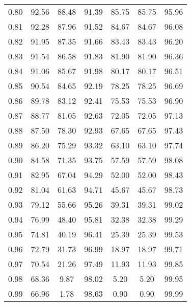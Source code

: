 \begin{tabular}{|c|c|c|c|c|c|c|}
      0.80 &     92.56 &     88.48 &      91.39 &   85.75 &      85.75 &         95.96 \\
      0.81 &     92.28 &     87.96 &      91.52 &   84.67 &      84.67 &         96.08 \\
      0.82 &     91.95 &     87.35 &      91.66 &   83.43 &      83.43 &         96.20 \\
      0.83 &     91.54 &     86.58 &      91.83 &   81.90 &      81.90 &         96.36 \\
      0.84 &     91.06 &     85.67 &      91.98 &   80.17 &      80.17 &         96.51 \\
      0.85 &     90.54 &     84.65 &      92.19 &   78.25 &      78.25 &         96.69 \\
      0.86 &     89.78 &     83.12 &      92.41 &   75.53 &      75.53 &         96.90 \\
      0.87 &     88.77 &     81.05 &      92.63 &   72.05 &      72.05 &         97.13 \\
      0.88 &     87.50 &     78.30 &      92.93 &   67.65 &      67.65 &         97.43 \\
      0.89 &     86.20 &     75.29 &      93.32 &   63.10 &      63.10 &         97.74 \\
      0.90 &     84.58 &     71.35 &      93.75 &   57.59 &      57.59 &         98.08 \\
      0.91 &     82.95 &     67.04 &      94.29 &   52.00 &      52.00 &         98.43 \\
      0.92 &     81.04 &     61.63 &      94.71 &   45.67 &      45.67 &         98.73 \\
      0.93 &     79.12 &     55.66 &      95.26 &   39.31 &      39.31 &         99.02 \\
      0.94 &     76.99 &     48.40 &      95.81 &   32.38 &      32.38 &         99.29 \\
      0.95 &     74.81 &     40.19 &      96.41 &   25.39 &      25.39 &         99.53 \\
      0.96 &     72.79 &     31.73 &      96.99 &   18.97 &      18.97 &         99.71 \\
      0.97 &     70.54 &     21.26 &      97.49 &   11.93 &      11.93 &         99.85 \\
      0.98 &     68.36 &      9.87 &      98.02 &    5.20 &       5.20 &         99.95 \\
      0.99 &     66.96 &      1.78 &      98.63 &    0.90 &       0.90 &         99.99 \\
\bottomrule
\end{tabular}
